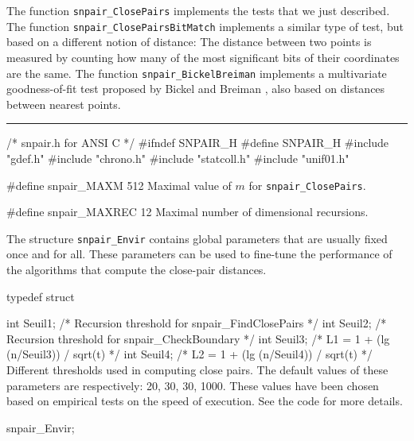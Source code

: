 The function {\tt snpair\_ClosePairs} implements the tests that we
just described.  The function {\tt snpair\_ClosePairsBitMatch}
implements a similar type of test, but based on a different notion of
distance: The distance between two points is measured by counting
how many of the most significant bits of their coordinates are the same.
The function {\tt snpair\_BickelBreiman} implements a multivariate
goodness-of-fit test proposed by Bickel and Breiman \cite{tBIC83a},
also based on distances between nearest points.


\bigskip\hrule

\code\hide
/* snpair.h  for ANSI C */
#ifndef SNPAIR_H
#define SNPAIR_H
\endhide
#include "gdef.h"
#include "chrono.h"
#include "statcoll.h"
#include "unif01.h"
\endcode




\code


#define snpair_MAXM 512
\endcode
\tab
  Maximal value of $m$ for  {\tt snpair\_ClosePairs}.
\endtab
\code


#define snpair_MAXREC 12
\endcode
\tab
 Maximal number of dimensional recursions.
\endtab

\ifdetailed  %


The structure {\tt snpair\_Envir} contains global parameters
that are usually fixed once and for all.
These parameters can be used to fine-tune the performance of
the algorithms that compute the close-pair distances.

\code

typedef struct {

   int Seuil1;        /* Recursion threshold for snpair_FindClosePairs */
   int Seuil2;        /* Recursion threshold for snpair_CheckBoundary  */
   int Seuil3;        /* L1 = 1 + (lg (n/Seuil3)) / sqrt(t) */
   int Seuil4;        /* L2 = 1 + (lg (n/Seuil4)) / sqrt(t) */
\endcode
 \tabb
  Different thresholds used in computing close pairs.
  The default values of these parameters are respectively:
  20, 30, 30, 1000.  These values have been chosen based on
  empirical  tests on the speed of execution.
  See the code for more details.
 \endtabb
\code

} snpair_Envir;


